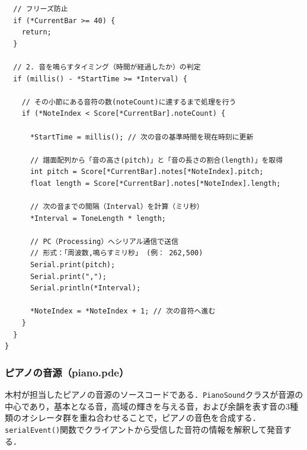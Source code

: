 \begin{lstlisting}
  // フリーズ防止
  if (*CurrentBar >= 40) {
    return; 
  }

  // 2. 音を鳴らすタイミング（時間が経過したか）の判定
  if (millis() - *StartTime >= *Interval) {
    
    // その小節にある音符の数(noteCount)に達するまで処理を行う
    if (*NoteIndex < Score[*CurrentBar].noteCount) {
      
      *StartTime = millis(); // 次の音の基準時間を現在時刻に更新
      
      // 譜面配列から「音の高さ(pitch)」と「音の長さの割合(length)」を取得
      int pitch = Score[*CurrentBar].notes[*NoteIndex].pitch;
      float length = Score[*CurrentBar].notes[*NoteIndex].length;
      
      // 次の音までの間隔（Interval）を計算（ミリ秒）
      *Interval = ToneLength * length;
      
      // PC（Processing）へシリアル通信で送信
      // 形式：「周波数,鳴らすミリ秒」 (例： 262,500)
      Serial.print(pitch);
      Serial.print(",");
      Serial.println(*Interval);
      
      *NoteIndex = *NoteIndex + 1; // 次の音符へ進む
    }
  }
}
\end{lstlisting}

\subsubsection{ピアノの音源（piano.pde）}
木村が担当したピアノの音源のソースコードである．\texttt{PianoSound}クラスが音源の中心であり，基本となる音，高域の輝きを与える音，および余韻を表す音の3種類のオシレータ群を重ね合わせることで，ピアノの音色を合成する．\texttt{serialEvent()}関数でクライアントから受信した音符の情報を解釈して発音する．

